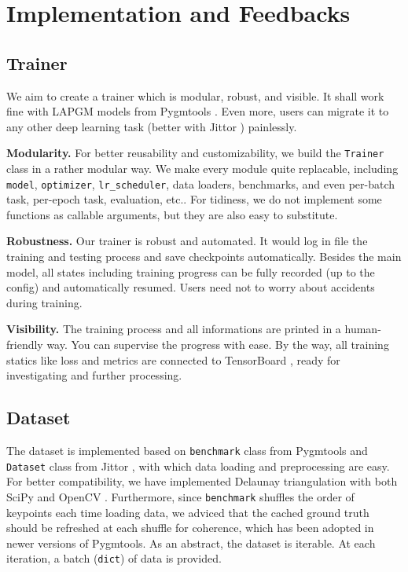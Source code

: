 \documentclass[a4paper]{article}
\begin{document}
\section{Implementation and Feedbacks}

\subsection{Trainer}
We aim to create a trainer which is modular, robust, and visible. It shall work fine with LAPGM models from Pygmtools \cite{pygmtools}. Even more, users can migrate it to any other deep learning task (better with Jittor \cite{jittor}) painlessly.

\textbf{Modularity.}
For better reusability and customizability, we build the \texttt{Trainer} class in a rather modular way. We make every module quite replacable, including \texttt{model}, \texttt{optimizer}, \texttt{lr\_scheduler}, data loaders, benchmarks, and even per-batch task, per-epoch task, evaluation, etc.. For tidiness, we do not implement some functions as callable arguments, but they are also easy to substitute.

\textbf{Robustness.}
Our trainer is robust and automated. It would log in file the training and testing process and save checkpoints automatically. Besides the main model, all states including training progress can be fully recorded (up to the config) and automatically resumed. Users need not to worry about accidents during training.

\textbf{Visibility.}
The training process and all informations are printed in a human-friendly way. You can supervise the progress with ease. By the way, all training statics like loss and metrics are connected to TensorBoard \cite{tensorflow}, ready for investigating and further processing.

\subsection{Dataset}
The dataset is implemented based on \texttt{benchmark} class from Pygmtools \cite{pygmtools} and \texttt{Dataset} class from Jittor \cite{jittor}, with which data loading and preprocessing are easy. For better compatibility, we have implemented Delaunay triangulation with both SciPy \cite{scipy} and OpenCV \cite{opencv}. Furthermore, since \texttt{benchmark} shuffles the order of keypoints each time loading data, we adviced that the cached ground truth should be refreshed at each shuffle for coherence, which has been adopted in newer versions of Pygmtools. As an abstract, the dataset is iterable. At each iteration, a batch (\texttt{dict}) of data is provided.
\end{document}
